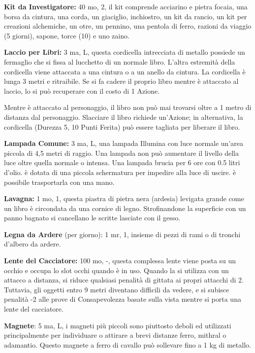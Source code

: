 \documentclass[a4paper,11pt,twoside,openany]{book}
\begin{document}
{\textbf{Kit da Investigatore:} 40 mo, 2, il kit comprende acciarino e pietra focaia, una borsa da cin­tura, una corda, un giaciglio, inchiostro, un kit da rancio, un kit per creazioni alchemiche, un otre, un pennino, una pentola di ferro, razioni da viaggio (5 giorni), sapone, torce (10) e uno zaino.

\textbf{Laccio per Libri:} 3 ma, L, questa cordicella intrecciata di metallo possiede un fermaglio che si fissa al lucchetto di un normale libro. L'altra estremità della cordicella viene attaccata a una cintura o a un anello da cintura. La cordicella è lunga 3 metri e ritraibile. Se si fa cadere il proprio libro mentre è attaccato al laccio, lo si può recuperare con il costo di 1 Azione.

Mentre è attaccato al personaggio, il libro non può mai trovarsi oltre a 1 metro di distanza dal personaggio. Slacciare il libro richiede un'Azione; in alternativa, la cordicella (Durezza 5, 10 Punti Ferita) può essere tagliata per liberare il libro.

\textbf{Lampada Comune:} 3 ma, L, una lampada Illumina con luce normale un'area piccola di 4,5 metri di raggio. Una lampada non può aumentare il livello della luce oltre quella normale o intensa. Una lampada brucia per 6 ore con 0.5 litri d'olio. è dotata di una piccola schermatura per impedire alla luce di uscire. è possibile trasportarla con una mano.

\textbf{Lavagna:} 1 mo, 1, questa piastra di pietra nera (ardesia) levigata grande come un libro è circondata da una cornice di legno. Strofinandone la superficie con un panno bagnato si cancellano le scritte lasciate con il gesso.

\textbf{Legna da Ardere} (per giorno): 1 mr, 1, insieme di pezzi di rami o di tronchi d'albero da ardere.

\textbf{Lente del Cacciatore:} 100 mo, -, questa complessa lente viene posta su un occhio e occupa lo slot occhi quando è in uso. Quando la si utilizza con un attacco a distanza, si riduce qualsiasi penalità di gittata ai propri attacchi di 2. Tuttavia, gli oggetti entro 9 metri diventano difficili da vedere, e si subisce penalità -2 alle prove di Consapevolezza basate sulla vista mentre si porta una lente del cacciatore.

\textbf{Magnete}: 5 ma, L, i magneti più piccoli sono piuttosto deboli ed utilizzati principalmente per individuare o attirare a brevi distanze ferro, mithral o adamantio. Questo magnete a ferro di cavallo può sollevare fino a 1 kg di metallo. 

}
\end{document}
